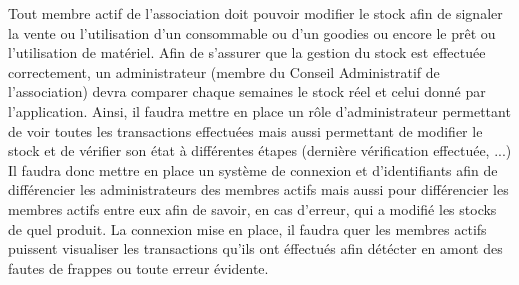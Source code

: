 \documentclass{article}
\begin{document}
  Tout membre actif de l’association doit pouvoir modifier le stock afin de signaler la vente ou l’utilisation d’un consommable ou d’un goodies ou encore le prêt ou l’utilisation de matériel. \newline
  Afin de s’assurer que la gestion du stock est effectuée correctement, un administrateur (membre du Conseil Administratif de l'association) devra comparer chaque semaines le stock réel et celui donné par l’application. \newline
  Ainsi, il faudra mettre en place un rôle d’administrateur permettant de voir toutes les transactions effectuées mais aussi permettant de modifier le stock et de vérifier son état à différentes étapes (dernière vérification effectuée, ...) \newline
  Il faudra donc mettre en place un système de connexion et d’identifiants afin de différencier les administrateurs des membres actifs mais aussi pour différencier les membres actifs entre eux afin de savoir, en cas d'erreur, qui a modifié les stocks de quel produit. \newline
  La connexion mise en place, il faudra quer les membres actifs puissent visualiser les transactions qu'ils ont éffectués afin détécter en amont des fautes de frappes ou toute erreur évidente.
\end{document}
